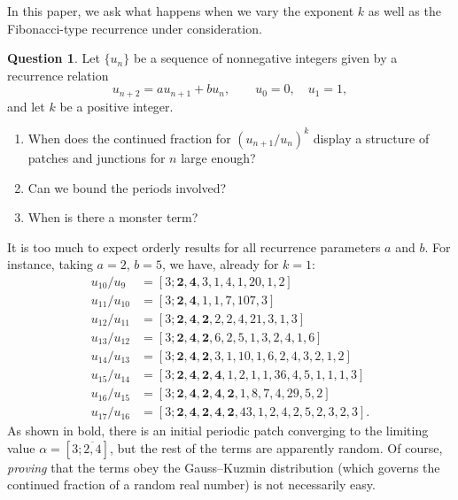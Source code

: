 \documentclass{article}
\numberwithin{equation}{section}
\theoremstyle{definition}
\newtheorem{qn}[thm]{Question}
\theoremstyle{remark}
\newcommand{\<}{\left\langle}
\renewcommand{\>}{\right\rangle}
\begin{document}
In this paper, we ask what happens when we vary the exponent $k$ as well as the Fibonacci-type recurrence under consideration.
\begin{qn}\label{qn:main}
  Let $\{u_n\}$ be a sequence of nonnegative integers given by a recurrence relation
  \begin{equation}\label{eq:u_n}
    u_{n+2} = a u_{n+1} + b u_n, \qquad u_0 = 0, \quad u_1 = 1,
  \end{equation}
  and let $k$ be a positive integer.
  \begin{enumerate}
    \item\label{qn:JPJ} When does the continued fraction for $(u_{n+1}/u_n)^k$ display a structure of patches and junctions for $n$ large enough?
    \item\label{qn:bound} Can we bound the periods involved?
    \item\label{qn:monster} When is there a monster term?
  \end{enumerate}
\end{qn}

It is too much to expect orderly results for all recurrence parameters $a$ and $b$. For instance, taking $a = 2$, $b = 5$, we have, already for $k = 1$:
\begin{equation} \label{eq:chaos}
  \begin{aligned}
    u_{10}/u_{9}  &= [3; \mathbf{2, 4}, 3, 1, 4, 1, 20, 1, 2]                    \\
    u_{11}/u_{10} &= [3; \mathbf{2, 4}, 1, 1, 7, 107, 3]                         \\
    u_{12}/u_{11} &= [3; \mathbf{2, 4, 2}, 2, 2, 4, 21, 3, 1, 3]                 \\
    u_{13}/u_{12} &= [3; \mathbf{2, 4, 2}, 6, 2, 5, 1, 3, 2, 4, 1, 6]            \\
    u_{14}/u_{13} &= [3; \mathbf{2, 4, 2}, 3, 1, 10, 1, 6, 2, 4, 3, 2, 1, 2]     \\
    u_{15}/u_{14} &= [3; \mathbf{2, 4, 2, 4}, 1, 2, 1, 1, 36, 4, 5, 1, 1, 1, 3]  \\
    u_{16}/u_{15} &= [3; \mathbf{2, 4, 2, 4, 2}, 1, 8, 7, 4, 29, 5, 2]           \\
    u_{17}/u_{16} &= [3; \mathbf{2, 4, 2, 4, 2}, 43, 1, 2, 4, 2, 5, 2, 3, 2, 3].
  \end{aligned}
\end{equation}
As shown in bold, there is an initial periodic patch converging to the limiting value $\alpha = [3; \overline{2,4}]$, but the rest of the terms are apparently random. Of course, \emph{proving} that the terms obey the Gauss--Kuzmin distribution (which governs the continued fraction of a random real number) is not necessarily easy.
\end{document}
